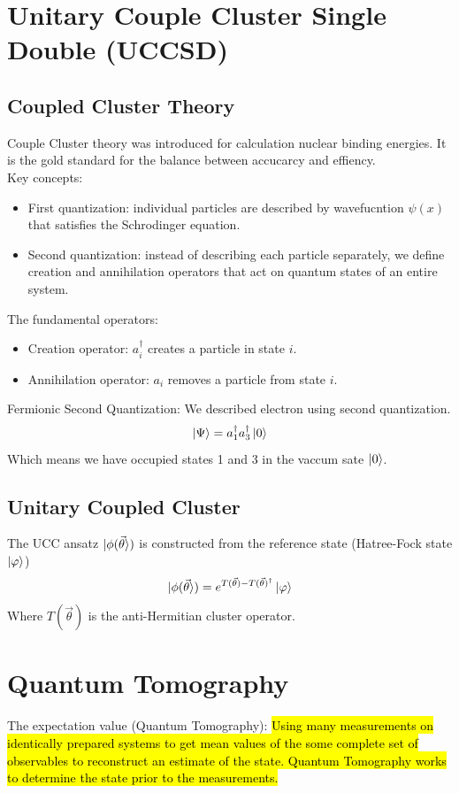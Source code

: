 \documentclass{article}
\begin{document}
\section{Unitary Couple Cluster Single Double (UCCSD)}
\subsection{Coupled Cluster Theory}
Couple Cluster theory was introduced for calculation nuclear binding energies. It is the gold standard for the balance between accucarcy and effiency. \\
Key concepts:
\begin{itemize}
	\item First quantization: individual particles are described by wavefucntion \(\psi(x)\) that satisfies the Schrodinger equation.
	\item Second quantization: instead of describing each particle separately, we define creation and annihilation operators that act on quantum states of an entire system.
\end{itemize}
The fundamental operators:
\begin{itemize}
	\item Creation operator: \(a^\dagger_i\) creates a particle in state \(i\).
	\item Annihilation operator: \(a_i\) removes a particle from state \(i\).
\end{itemize}
Fermionic Second Quantization: We described electron using second quantization.
\[\ket{\Psi} = a^\dagger_1 a^\dagger_3 \ket{0}\]
Which means we have occupied states 1 and 3 in the vaccum sate \(\ket{0}\).\\

\subsection{Unitary Coupled Cluster}
The UCC ansatz \(\ket{\phi(\vec{\theta}})\) is constructed from the reference state (Hatree-Fock state \(\ket{\varphi}\))
\begin{equation}
	\ket{\phi(\vec{\theta}}) = e^{T(\vec{\theta})-T(\vec{\theta})^\dagger}\ket{\varphi}
\end{equation}
Where \(T(\vec{\theta})\) is the anti-Hermitian cluster operator. 


\section{Quantum Tomography}
The expectation value (Quantum Tomography):
\hl{Using many measurements on identically prepared systems to get mean values of the some complete set of observables to reconstruct an estimate of the state. Quantum Tomography works to
	determine the state prior to the measurements.}\\
\end{document}
